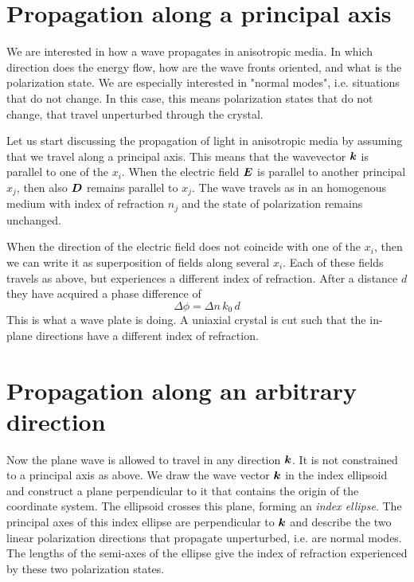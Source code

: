 \section{Propagation along a principal axis}

We are interested in how a wave propagates in anisotropic media. In which direction does the energy flow, how are the wave fronts oriented, and what is the polarization state. We are especially interested in "normal modes", i.e. situations that do not change. In this case, this means polarization states that do not change, that travel unperturbed through the crystal.

Let us start discussing the propagation of light in anisotropic media by assuming that we travel along a principal axis. This means that the wavevector $\boldsymbol{k}$ is parallel to one of the $x_i$. When the electric field $\boldsymbol{E}$ is parallel to another principal $x_j$, then also $\boldsymbol{D}$ remains parallel to $x_j$. The wave travels as in an homogenous medium with index of refraction $n_j$ and the state of polarization remains unchanged.

When the direction of the electric field does not coincide with one of the $x_i$, then we can write it as superposition of fields along several $x_i$. Each of these fields travels as above, but  experiences a different index of refraction. After a distance $d$ they  have acquired a phase difference of 
\begin{equation}
    \Delta \phi = \Delta n \, k_0 \, d
\end{equation}
This is what a wave plate is doing. A uniaxial crystal is cut such that the in-plane directions have a different index of refraction.


\section{Propagation along an arbitrary direction}

Now the plane wave is allowed to travel in any direction $\boldsymbol{k}$. It is not constrained to a principal axis as above. We draw the wave vector $\boldsymbol{k}$ in the index ellipsoid and construct a plane perpendicular to it that contains the origin of the coordinate system. The ellipsoid crosses this plane, forming an \emph{index ellipse}. The principal axes of this index ellipse are perpendicular to $\boldsymbol{k}$ and describe the two linear polarization directions that propagate unperturbed, i.e. are normal modes. The lengths of the semi-axes of the ellipse give the index of refraction experienced by these two polarization states.



